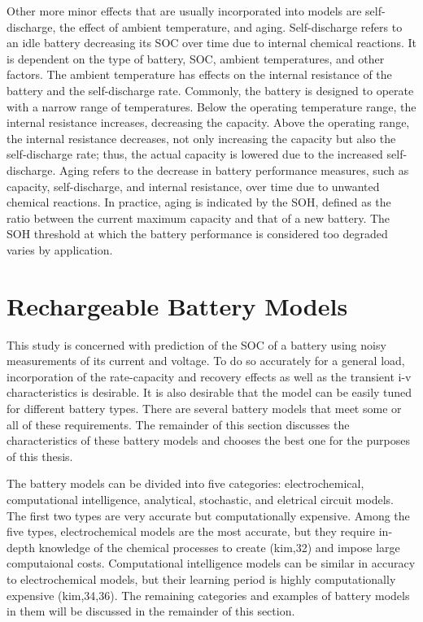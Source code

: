 Other more minor effects that are usually incorporated into models are self-discharge, the effect of ambient temperature, and aging. Self-discharge refers to an idle battery decreasing its SOC over time due to internal chemical reactions. It is dependent on the type of battery, SOC, ambient temperatures, and other factors. The ambient temperature has effects on the internal resistance of the battery and the self-discharge rate. Commonly, the battery is designed to operate with a narrow range of temperatures. Below the operating temperature range, the internal resistance increases, decreasing the capacity. Above the operating range, the internal resistance decreases, not only increasing the capacity but also the self-discharge rate; thus, the actual capacity is lowered due to the increased self-discharge. Aging refers to the decrease in battery performance measures, such as capacity, self-discharge, and internal resistance, over time due to unwanted chemical reactions. In practice, aging is indicated by the SOH, defined as the ratio between the current maximum capacity and that of a new battery. The SOH threshold at which the battery performance is considered too degraded varies by application.


\section{Rechargeable Battery Models}

This study is concerned with prediction of the SOC of a battery using noisy measurements of its current and voltage. To do so accurately for a general load, incorporation of the rate-capacity and recovery effects as well as the transient i-v characteristics is desirable. It is also desirable that the model can be easily tuned for different battery types. There are several battery models that meet some or all of these requirements. The remainder of this section discusses the characteristics of these battery models and chooses the best one for the purposes of this thesis.

The battery models can be divided into five categories: electrochemical, computational intelligence, analytical, stochastic, and eletrical circuit models. The first two types are very accurate but computationally expensive. Among the five types, electrochemical models are the most accurate, but they require in-depth knowledge of the chemical processes to create (kim,32) and impose large computaional costs. Computational intelligence models can be similar in accuracy to electrochemical models, but their learning period is highly computationally expensive (kim,34,36). The remaining categories and examples of battery models in them will be discussed in the remainder of this section.

